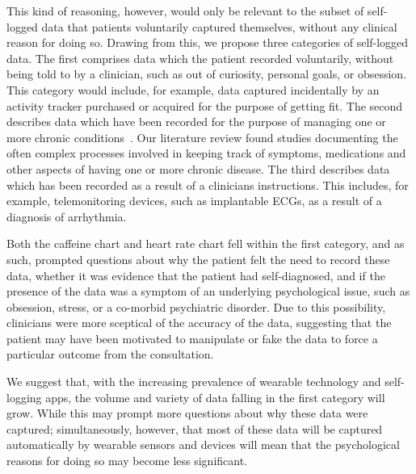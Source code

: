 \documentclass{sigchi}
\begin{document}
This kind of reasoning, however, would only be relevant to the subset of self-logged data that patients voluntarily captured themselves, without any clinical reason for doing so.  Drawing from this, we propose three categories of self-logged data. The first comprises data which the patient recorded voluntarily, without being told to by a clinician, such as out of curiosity, personal goals, or obsession. This category would include, for example, data captured incidentally by an activity tracker purchased or acquired for the purpose of getting fit. The second describes data which have been recorded for the purpose of managing one or more chronic conditions~\cite{ancker_invisible_2015}.  Our literature review found studies documenting the often complex processes involved in keeping track of symptoms, medications and other aspects of having one or more chronic disease. The third describes data which has been recorded as a result of a clinicians instructions. This includes, for example, telemonitoring devices, such as implantable ECGs, as a result of a diagnosis of arrhythmia.

Both the caffeine chart and heart rate chart fell within the first category, and as such, prompted questions about why the patient felt the need to record these data, whether it was evidence that the patient had self-diagnosed, and if the presence of the data was a symptom of an underlying psychological issue, such as obsession, stress, or a co-morbid psychiatric disorder. Due to this possibility, clinicians were more sceptical of the accuracy of the data, suggesting that the patient may have been motivated to manipulate or fake the data to force a particular outcome from the consultation.

We suggest that, with the increasing prevalence of wearable technology and self-logging apps, the volume and variety of data falling in the first category will grow.  While this may prompt more questions about why these data were captured; simultaneously, however, that most of these data will be captured automatically by wearable sensors and devices will mean that the psychological reasons for doing so may become less significant.


\end{document}
